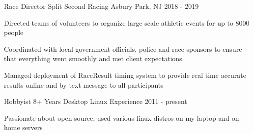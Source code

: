 
\begin{cventries}
  \cventry
    {Race Director} %
    {Split Second Racing} %
    {Asbury Park, NJ} %
    {2018 - 2019} %
    {
      \begin{cvitems} %
        \item {Directed teams of volunteers to organize large scale athletic events for up to 8000 people}
		\item {Coordinated with local government officials, police and race sponsors to ensure that everything went smoothly and met client expectations}
		\item {Managed deployment of RaceResult timing system to provide real time accurate results online and by text message to all participants}
      \end{cvitems}
    }

  \cventry
    {Hobbyist} %
    {8+ Years Desktop Linux Experience} %
    {} %
    {2011 - present} %
    {
      \begin{cvitems} %
        \item {Passionate about open source, used various linux distros on my laptop and on home servers}
      \end{cvitems}
    }

\end{cventries}
